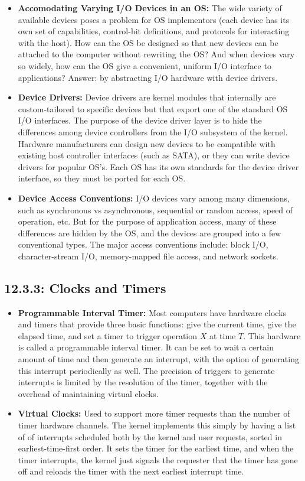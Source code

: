 \documentclass[12pt]{article}
\begin{document}
\begin{itemize}
    \item \textbf{Accomodating Varying I/O Devices in an OS:} The wide variety of available devices poses a problem for OS implementors (each device has its own set of capabilities, control-bit definitions, and protocols for interacting with the host). How can the OS be designed so that new devices can be attached to the computer without rewriting the OS? And when devices vary so widely, how can the OS give a convenient, uniform I/O interface to applications? Answer: by abstracting I/O hardware with device drivers.
    \item \textbf{Device Drivers:} Device drivers are kernel modules that internally are custom-tailored to specific devices but that export one of the standard OS I/O interfaces. The purpose of the device driver layer is to hide the differences among device controllers from the I/O subsystem of the kernel. Hardware manufacturers can design new devices to be compatible with existing host controller interfaces (such as SATA), or they can write device drivers for popular OS's. Each OS has its own standards for the device driver interface, so they must be ported for each OS.
    \item \textbf{Device Access Conventions:} I/O devices vary among many dimensions, such as synchronous vs asynchronous, sequential or random access, speed of operation, etc. But for the purpose of application access, many of these differences are hidden by the OS, and the devices are grouped into a few conventional types. The major access conventions include: block I/O, character-stream I/O, memory-mapped file access, and network sockets.
\end{itemize}

\subsection*{12.3.3: Clocks and Timers}

\begin{itemize}
    \item \textbf{Programmable Interval Timer:} Most computers have hardware clocks and timers that provide three basic functions: give the current time, give the elapsed time, and set a timer to trigger operation \(X\) at time \(T\). This hardware is called a programmable interval timer. It can be set to wait a certain amount of time and then generate an interrupt, with the option of generating this interrupt periodically as well. The precision of triggers to generate interrupts is limited by the resolution of the timer, together with the overhead of maintaining virtual clocks.
    \item \textbf{Virtual Clocks:} Used to support more timer requests than the number of timer hardware channels. The kernel implements this simply by having a list of of interrupts scheduled both by the kernel and user requests, sorted in earliest-time-first order. It sets the timer for the earliest time, and when the timer interrupts, the kernel just signals the requester that the timer has gone off and reloads the timer with the next earliest interrupt time.
\end{itemize}
\end{document}
